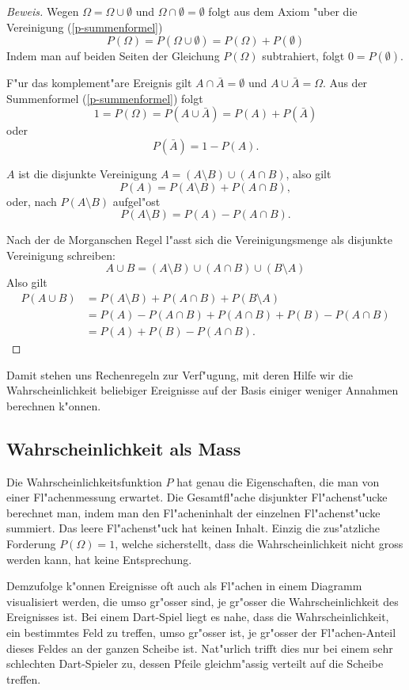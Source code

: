 \begin{proof}[Beweis]
Wegen $\Omega = \Omega \cup\emptyset$ und
$\Omega\cap\emptyset = \emptyset$ folgt aus dem Axiom
"uber die Vereinigung  (\ref{p-summenformel})
\[
P(\Omega) = P(\Omega \cup \emptyset) = P(\Omega) + P(\emptyset)
\]
Indem man auf beiden Seiten der Gleichung $P(\Omega)$ subtrahiert,
folgt $0 = P(\emptyset)$.

F"ur das komplement"are Ereignis gilt $A\cap\bar A=\emptyset$ und
$A\cup\bar A=\Omega$. Aus der Summenformel (\ref{p-summenformel}) folgt
\[
1 = P(\Omega) = P(A\cup\bar A) = P(A) + P(\bar A)
\]
oder
\[
P(\bar A) = 1 - P(A).
\]

$A$ ist die disjunkte Vereinigung $A=(A\setminus B) \cup (A\cap B)$,
also gilt
\[
P(A)=P(A\setminus B) + P(A\cap B),
\]
oder, nach $P(A\setminus B)$ aufgel"ost
\[
P(A\setminus B) = P(A) - P(A\cap B).
\]

Nach der de Morganschen Regel l"asst sich die Vereinigungsmenge
als disjunkte Vereinigung schreiben:
\[
A\cup B =  (A\setminus B) \cup (A\cap B) \cup (B\setminus A)
\]
Also gilt
\begin{align*}
P(A\cup B)&=P(A\setminus B) + P(A\cap B) + P(B\setminus A)\\
&=P(A) - P(A\cap B) + P(A\cap B) + P(B) - P(A\cap B)\\
&=P(A) + P(B) - P(A\cap B).
\end{align*}
\end{proof}
Damit stehen uns Rechenregeln zur Verf"ugung, mit deren Hilfe wir
die Wahrscheinlichkeit beliebiger Ereignisse auf der Basis einiger
weniger Annahmen berechnen k"onnen.

\subsection{Wahrscheinlichkeit als Mass}
Die Wahrscheinlichkeitsfunktion $P$ hat genau die Eigenschaften,
die man von einer Fl"achenmessung erwartet.
Die Gesamtfl"ache disjunkter Fl"achenst"ucke berechnet man,
indem man den Fl"acheninhalt der einzelnen Fl"achenst"ucke summiert.
Das leere Fl"achenst"uck hat keinen Inhalt.
Einzig die zus"atzliche Forderung $P(\Omega)=1$, welche
sicherstellt, dass die Wahrscheinlichkeit nicht gross werden kann,
hat keine Entsprechung.

Demzufolge k"onnen Ereignisse oft auch als Fl"achen in einem Diagramm
visualisiert werden,
die umso gr"osser sind, je gr"osser die Wahrscheinlichkeit des Ereignisses
ist. Bei einem Dart-Spiel liegt es nahe, dass die Wahrscheinlichkeit, ein
bestimmtes Feld zu treffen, umso gr"osser ist, je gr"osser der Fl"achen-Anteil
dieses Feldes an der ganzen Scheibe ist. Nat"urlich trifft dies nur bei einem
sehr schlechten Dart-Spieler zu, dessen Pfeile gleichm"assig verteilt auf
die Scheibe treffen.

